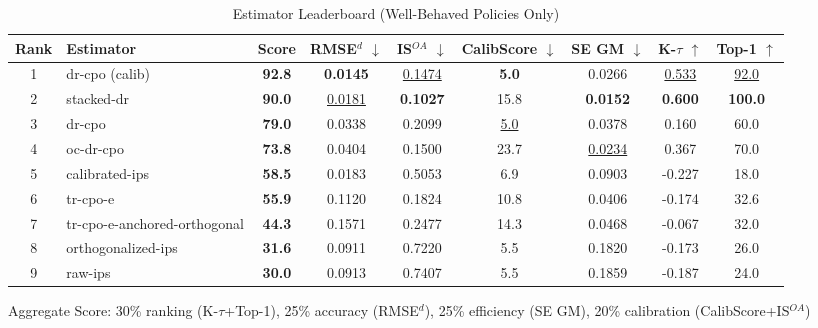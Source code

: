 \begin{table}[htbp]
\centering
\caption{Estimator Leaderboard (Well-Behaved Policies Only)}
\label{tab:leaderboard}
\begin{tabular}{cl|c|cccccc}
\toprule
Rank & Estimator & Score & RMSE$^d$ $\downarrow$ & IS$^{OA}$ $\downarrow$ & CalibScore $\downarrow$ & SE GM $\downarrow$ & K-$\tau$ $\uparrow$ & Top-1 $\uparrow$ \\
\midrule
1 & dr-cpo (calib) & \textbf{92.8} & \textbf{0.0145} & \underline{0.1474} & \textbf{5.0} & 0.0266 & \underline{0.533} & \underline{92.0} \\
2 & stacked-dr & \textbf{90.0} & \underline{0.0181} & \textbf{0.1027} & 15.8 & \textbf{0.0152} & \textbf{0.600} & \textbf{100.0} \\
3 & dr-cpo & \textbf{79.0} & 0.0338 & 0.2099 & \underline{5.0} & 0.0378 & 0.160 & 60.0 \\
4 & oc-dr-cpo & \textbf{73.8} & 0.0404 & 0.1500 & 23.7 & \underline{0.0234} & 0.367 & 70.0 \\
5 & calibrated-ips & \textbf{58.5} & 0.0183 & 0.5053 & 6.9 & 0.0903 & -0.227 & 18.0 \\
6 & tr-cpo-e & \textbf{55.9} & 0.1120 & 0.1824 & 10.8 & 0.0406 & -0.174 & 32.6 \\
7 & tr-cpo-e-anchored-orthogonal & \textbf{44.3} & 0.1571 & 0.2477 & 14.3 & 0.0468 & -0.067 & 32.0 \\
8 & orthogonalized-ips & \textbf{31.6} & 0.0911 & 0.7220 & 5.5 & 0.1820 & -0.173 & 26.0 \\
9 & raw-ips & \textbf{30.0} & 0.0913 & 0.7407 & 5.5 & 0.1859 & -0.187 & 24.0 \\
\bottomrule
\end{tabular}
\footnotesize{Aggregate Score: 30\% ranking (K-$\tau$+Top-1), 25\% accuracy (RMSE$^d$), 25\% efficiency (SE GM), 20\% calibration (CalibScore+IS$^{OA}$)}
\end{table}